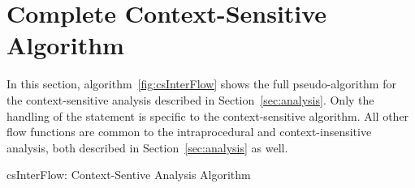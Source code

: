 \section{Complete Context-Sensitive Algorithm}\label{app:algo}

In this section, algorithm~\ref{fig:csInterFlow} shows the full
pseudo-algorithm for the context-sensitive analysis described
in Section~\ref{sec:analysis}.
Only the handling of the \callt statement is specific to
the context-sensitive algorithm. All other flow functions
are common to the intraprocedural and context-insensitive
analysis, both described in Section~\ref{sec:analysis} as well.

\begin{algorithm}[!hbtp]
\caption{csInterFlow: Context-Sentive Analysis Algorithm}\label{fig:csInterFlow}
\SetAlgoLined
\LinesNumbered
\DontPrintSemicolon
{}



\end{algorithm}
